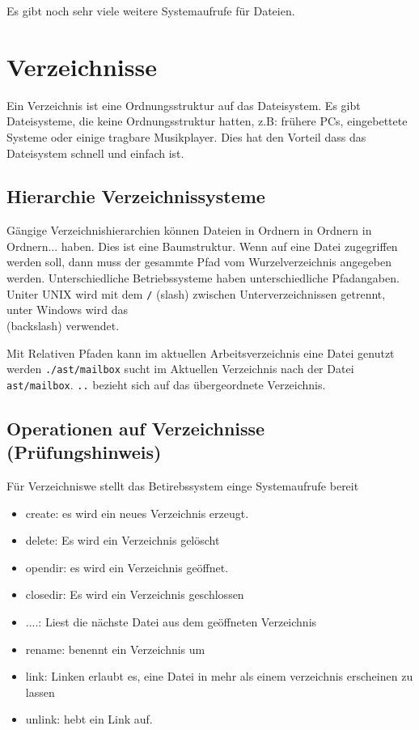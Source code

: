 Es gibt noch sehr viele weitere Systemaufrufe für Dateien.

\section{Verzeichnisse}

Ein Verzeichnis ist eine Ordnungsstruktur auf das Dateisystem. Es gibt
Dateisysteme, die keine Ordnungsstruktur hatten, z.B: frühere PCs, eingebettete
Systeme oder einige tragbare Musikplayer. Dies hat den Vorteil dass das
Dateisystem schnell und einfach ist.

\subsection{Hierarchie Verzeichnissysteme}

Gängige Verzeichnishierarchien können Dateien in Ordnern in Ordnern in
Ordnern... haben. Dies ist eine Baumstruktur. Wenn auf eine Datei zugegriffen
werden soll, dann muss der gesammte Pfad vom Wurzelverzeichnis angegeben
werden. Unterschiedliche Betriebssysteme haben unterschiedliche Pfadangaben.
Uniter UNIX wird mit dem \texttt{/} (slash) zwischen Unterverzeichnissen
getrennt, unter Windows wird das \texttt{\\} (backslash)
verwendet.

Mit Relativen Pfaden kann im aktuellen Arbeitsverzeichnis eine Datei genutzt
werden \texttt{./ast/mailbox} sucht im Aktuellen Verzeichnis nach der Datei
\texttt{ast/mailbox}. \texttt{..} bezieht sich auf das übergeordnete
Verzeichnis.

\subsection{Operationen auf Verzeichnisse (Prüfungshinweis)}

Für Verzeichniswe stellt das Betirebssystem einge Systemaufrufe bereit

\begin{itemize}
    \item create: es wird ein neues Verzeichnis erzeugt.
    \item delete: Es wird ein Verzeichnis gelöscht
    \item opendir: es wird ein Verzeichnis geöffnet.
    \item closedir: Es wird ein Verzeichnis geschlossen
    \item ....: Liest die nächste Datei aus dem geöffneten Verzeichnis
    \item rename: benennt ein Verzeichnis um
    \item link: Linken erlaubt es, eine Datei in mehr als einem verzeichnis erscheinen zu
          lassen
    \item unlink: hebt ein Link auf.
\end{itemize}

